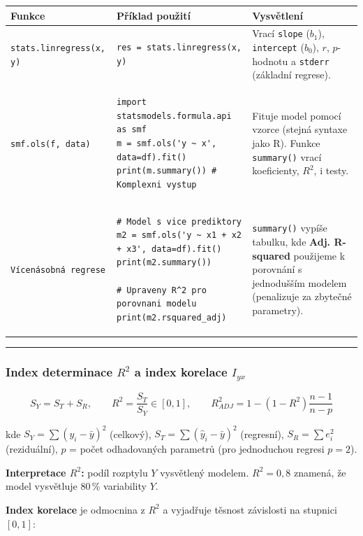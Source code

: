 \documentclass[a4paper, 11pt]{article}
\newenvironment{funkcedict}
{%
  \begingroup
  \renewcommand{\arraystretch}{1.4}%
  \lstset{basicstyle=\ttfamily\small, columns=fullflexible}%
  \setlength{\tabcolsep}{4pt}%
  \begin{tabular}{p{0.19\textwidth} p{0.38\textwidth} p{0.30\textwidth}}
  \textbf{Funkce} & \textbf{Příklad použití} & \textbf{Vysvětlení} \\
  \midrule
}
{%
  \end{tabular}%
  \endgroup
}
\begin{document}
\begin{funkcedict}

	\texttt{stats.linregress(x, y)} &
	\begin{lstlisting}
res = stats.linregress(x, y)
	\end{lstlisting}
	& Vrací \texttt{slope} ($b_1$), \texttt{intercept} ($b_0$), $r$, $p$-hodnotu a \texttt{stderr} (základní regrese). \\

	\texttt{smf.ols(f, data)} &
	\begin{lstlisting}
import statsmodels.formula.api as smf
m = smf.ols('y ~ x', data=df).fit()
print(m.summary()) # Komplexni vystup
	\end{lstlisting}
	& Fituje model pomocí vzorce (stejná syntaxe jako R). Funkce \texttt{summary()} vrací koeficienty, $R^2$, i testy. \\

	\texttt{Vícenásobná regrese} &
	\begin{lstlisting}
# Model s vice prediktory
m2 = smf.ols('y ~ x1 + x2 + x3', data=df).fit()
print(m2.summary())

# Upraveny R^2 pro porovnani modelu
print(m2.rsquared_adj)
	\end{lstlisting}
	& \texttt{summary()} vypíše tabulku, kde \textbf{Adj. R-squared} použijeme k porovnání s jednodušším modelem (penalizuje za zbytečné parametry). \\

\end{funkcedict}
\noindent\hrule\medskip

\subsubsection{Index determinace $R^2$ a index korelace $I_{yx}$}

\begin{equation*}
	S_Y = S_T + S_R, \qquad R^2 = \frac{S_T}{S_Y} \in [0,1], \qquad
	R^2_{ADJ} = 1 - (1-R^2)\frac{n-1}{n-p}
\end{equation*}

kde $S_Y = \sum(y_i-\bar{y})^2$ (celkový), $S_T = \sum(\hat{y}_i-\bar{y})^2$ (regresní), $S_R = \sum e_i^2$ (reziduální), $p$ = počet odhadovaných parametrů (pro jednoduchou regresi $p=2$).

\textbf{Interpretace $R^2$:} podíl rozptylu $Y$ vysvětlený modelem. $R^2 = 0{,}8$ znamená, že model vysvětluje 80\,\% variability $Y$.

\medskip
\textbf{Index korelace} je odmocnina z $R^2$ a vyjadřuje těsnost závislosti na stupnici $[0,1]$:
\end{document}
